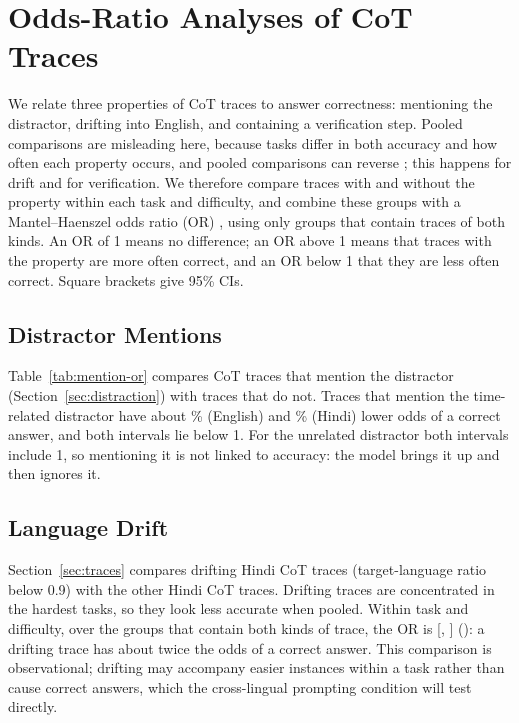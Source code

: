 \section{Odds-Ratio Analyses of CoT Traces}
\label{app:or}

We relate three properties of CoT traces to answer correctness: mentioning the distractor, drifting into English, and containing a verification step. Pooled comparisons are misleading here, because tasks differ in both accuracy and how often each property occurs, and pooled comparisons can reverse \citep{simpson-1951-interpretation}; this happens for drift and for verification. We therefore compare traces with and without the property within each task and difficulty, and combine these groups with a Mantel--Haenszel odds ratio (OR) \citep{mantel-haenszel-1959-statistical}, using only groups that contain traces of both kinds. An OR of 1 means no difference; an OR above 1 means that traces with the property are more often correct, and an OR below 1 that they are less often correct. Square brackets give 95\% CIs.

\subsection{Distractor Mentions}
\label{app:mention}



Table~\ref{tab:mention-or} compares CoT traces that mention the distractor (Section~\ref{sec:distraction}) with traces that do not. Traces that mention the time-related distractor have about \EnMentionSimOddsDrop{}\% (English) and \HiMentionSimOddsDrop{}\% (Hindi) lower odds of a correct answer, and both intervals lie below 1. For the unrelated distractor both intervals include 1, so mentioning it is not linked to accuracy: the model brings it up and then ignores it.

\subsection{Language Drift}
\label{app:drift}

Section~\ref{sec:traces} compares drifting Hindi CoT traces (target-language ratio below 0.9) with the other Hindi CoT traces. Drifting traces are concentrated in the hardest tasks, so they look less accurate when pooled. Within task and difficulty, over the \DriftStrata{} groups that contain both kinds of trace, the OR is \DriftOR{} [\DriftORLo{}, \DriftORHi{}] (\DriftP{}): a drifting trace has about twice the odds of a correct answer. This comparison is observational; drifting may accompany easier instances within a task rather than cause correct answers, which the cross-lingual prompting condition will test directly.

